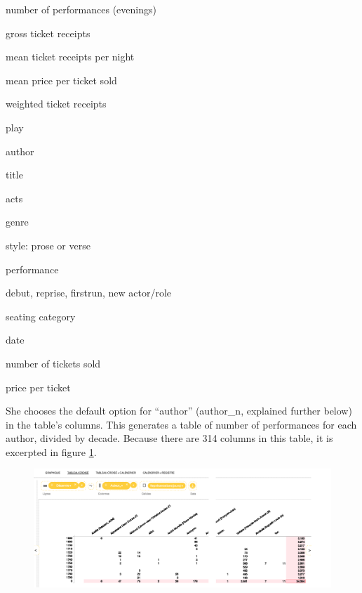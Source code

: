 \documentclass[	DIV=calc,%
							paper=a4,%
							fontsize=11pt,%
							twocolumn]{scrartcl}	 					%
\begin{document}
\begin{framefloat}[b]
	\fontsize{8pt}{8pt}\selectfont
  \begin{description}[noitemsep,align=left]

		\item[Measures]
			\item number of performances (evenings)
			\item gross ticket receipts
			\item mean ticket receipts per night
			\item mean price per ticket sold
			\item weighted ticket receipts

    \vspace{10pt}
		\item[Dimensions]
			\item play
			\item author
			\item title
			\item acts
			\item genre
			\item style: prose or verse
			\item performance
			\item debut, reprise, firstrun, new actor/role
			\item seating category

    \hrulefill
		\item[Facts]
			\item date
			\item number of tickets sold
			\item price per ticket
  \end{description}
\end{framefloat}

She chooses the default option for ``author'' (author\_n, explained further below) in the table’s columns.  This generates a table of number of performances for each author, divided by decade.  Because there are 314 columns in this table, it is excerpted in figure \ref{fig:stitched-author-table}.

\begin{figure}
  \centering
	\includegraphics[width=7in]{steps/stitched-author-table.png}
	\caption{}
	\label{fig:stitched-author-table}
\end{figure}
\end{document}
